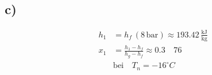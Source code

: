 

\subsection*{c)}

\begin{align*}
    h_1 &= h_f \, (8 \, \text{bar}) \approx 193.42 \, \frac{\text{kJ}}{\text{kg}} \\
    x_1 &= \frac{h_1 - h_f}{h_g - h_f} \approx 0.3 \quad 76 \\
    &\text{bei} \quad T_n = -16^\circ C
\end{align*}